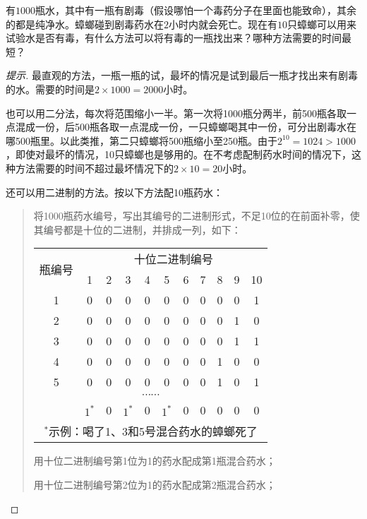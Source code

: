 \begin{example}
  有$1000$瓶水，其中有一瓶有剧毒（假设哪怕一个毒药分子在里面也能致命），其余的都是纯净水。蟑螂碰到剧毒药水在$2$小时内就会死亡。现在有$10$只蟑螂可以用来试验水是否有毒，有什么方法可以将有毒的一瓶找出来？哪种方法需要的时间最短？
\end{example}
\begin{proof}[提示]
  最直观的方法，一瓶一瓶的试，最坏的情况是试到最后一瓶才找出来有剧毒的水。需要的时间是$2\times1000=2000$小时。

  也可以用二分法，每次将范围缩小一半。第一次将1000瓶分两半，前500瓶各取一点混成一份，后500瓶各取一点混成一份，一只蟑螂喝其中一份，可分出剧毒水在哪500瓶里。以此类推，第二只蟑螂将500瓶缩小至250瓶。由于$2^{10}=1024>1000$，即使对最坏的情况，10只蟑螂也是够用的。在不考虑配制药水时间的情况下，这种方法需要的时间不超过最坏情况下的$2\times10=20$小时。

  还可以用二进制的方法。按以下方法配10瓶药水：
  \begin{quotation}
    将1000瓶药水编号，写出其编号的二进制形式，不足10位的在前面补零，使其编号都是十位的二进制，并排成一列，如下：
    \begin{center}
    \begin{tabular}{ccccccccccc}
      \toprule[2pt]
      \multirow{2}{*}{瓶编号} & \multicolumn{10}{c}{十位二进制编号}\\
      \cline{2-11} & 1 & 2 & 3 & 4 & 5 & 6 & 7 & 8 & 9 & 10\\
      \midrule
      1 & 0 & 0 & 0 & 0 & 0 & 0 & 0 & 0 & 0 & 1\\
      2 & 0 & 0 & 0 & 0 & 0 & 0 & 0 & 0 & 1 & 0\\
      3 & 0 & 0 & 0 & 0 & 0 & 0 & 0 & 0 & 1 & 1\\
      4 & 0 & 0 & 0 & 0 & 0 & 0 & 0 & 1 & 0 & 0\\
      5 & 0 & 0 & 0 & 0 & 0 & 0 & 0 & 1 & 0 & 1\\
      \multicolumn{11}{c}{$\cdots\cdots$}\\
      \hline
        & $1^*$ & 0 & $1^*$ & 0 & $1^*$ & 0 & 0 & 0 & 0 & 0\\
      \multicolumn{11}{c}{$^*$示例：喝了1、3和5号混合药水的蟑螂死了}\\  
      \bottomrule[2pt]
    \end{tabular}
    \end{center}

    用十位二进制编号第1位为1的药水配成第1瓶混合药水；

    用十位二进制编号第2位为1的药水配成第2瓶混合药水；


\end{quotation}
\end{proof}
